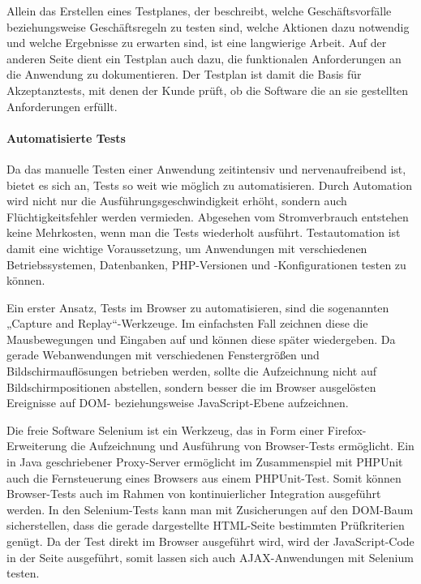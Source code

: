 Allein das Erstellen eines Testplanes, der beschreibt, welche Geschäftsvorfälle beziehungsweise
Geschäftsregeln zu testen sind, welche Aktionen dazu notwendig und welche Ergebnisse zu
erwarten sind, ist eine langwierige Arbeit. Auf der anderen Seite dient ein Testplan
auch dazu, die funktionalen Anforderungen an die Anwendung zu dokumentieren.
Der Testplan ist damit die Basis für Akzeptanztests, mit denen der Kunde prüft, ob die 
Software die an sie gestellten Anforderungen erfüllt.

\paragraph{Automatisierte Tests}
Da das manuelle Testen einer Anwendung zeitintensiv und nervenaufreibend ist, bietet es
sich an, Tests so weit wie möglich zu automatisieren. Durch Automation wird nicht nur die
Ausführungsgeschwindigkeit erhöht, sondern auch Flüchtigkeitsfehler werden vermieden.
Abgesehen vom Stromverbrauch entstehen keine Mehrkosten, wenn man die Tests wiederholt
ausführt. Testautomation ist damit eine wichtige Voraussetzung, um Anwendungen
mit verschiedenen Betriebssystemen, Datenbanken, PHP-Versionen und -Konfigurationen
testen zu können.

Ein erster Ansatz, Tests im Browser zu automatisieren, sind die sogenannten „Capture and
Replay“-Werkzeuge. Im einfachsten Fall zeichnen diese die Mausbewegungen und Eingaben
auf und können diese später wiedergeben. Da gerade Webanwendungen mit verschiedenen
Fenstergrößen und Bildschirmauflösungen betrieben werden, sollte die Aufzeichnung nicht
auf Bildschirmpositionen abstellen, sondern besser die im Browser ausgelösten
Ereignisse auf DOM- beziehungsweise JavaScript-Ebene aufzeichnen.

Die freie Software Selenium ist ein Werkzeug, das in Form einer Firefox-Erweiterung die
Aufzeichnung und Ausführung von Browser-Tests ermöglicht. Ein in Java geschriebener
Proxy-Server ermöglicht im Zusammenspiel mit PHPUnit auch die Fernsteuerung eines
Browsers aus einem PHPUnit-Test. Somit können Browser-Tests auch im Rahmen von 
kontinuierlicher Integration ausgeführt werden.
In den Selenium-Tests kann man mit Zusicherungen auf den DOM-Baum sicherstellen,
dass die gerade dargestellte HTML-Seite bestimmten Prüfkriterien genügt. Da der Test 
direkt im Browser ausgeführt wird, wird der JavaScript-Code in der Seite ausgeführt, somit
lassen sich auch AJAX-Anwendungen mit Selenium testen.

